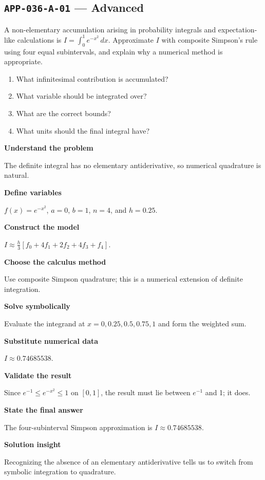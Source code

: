 \documentclass[11pt]{book}
\newcommand{\pid}[1]{\texttt{#1}}
\begin{document}
\subsection*{\pid{APP-036-A-01} — Advanced}
\begin{problembox}
A non-elementary accumulation arising in probability integrals and expectation-like calculations is $I=\int_0^1 e^{-x^2}\,dx$. Approximate $I$ with composite Simpson's rule using four equal subintervals, and explain why a numerical method is appropriate.
\end{problembox}
\begin{promptbox}\begin{enumerate}
\item What infinitesimal contribution is accumulated?
\item What variable should be integrated over?
\item What are the correct bounds?
\item What units should the final integral have?
\end{enumerate}\end{promptbox}
\begin{solutionbox}
\textbf{Understand the problem}\par The definite integral has no elementary antiderivative, so numerical quadrature is natural.\par\medskip
\textbf{Define variables}\par $f(x)=e^{-x^2}$, $a=0$, $b=1$, $n=4$, and $h=0.25$.\par\medskip
\textbf{Construct the model}\par $I\approx\frac{h}{3}[f_0+4f_1+2f_2+4f_3+f_4]$.\par\medskip
\textbf{Choose the calculus method}\par Use composite Simpson quadrature; this is a numerical extension of definite integration.\par\medskip
\textbf{Solve symbolically}\par Evaluate the integrand at $x=0,0.25,0.5,0.75,1$ and form the weighted sum.\par\medskip
\textbf{Substitute numerical data}\par $I\approx 0.74685538$.\par\medskip
\textbf{Validate the result}\par Since $e^{-1}\le e^{-x^2}\le1$ on $[0,1]$, the result must lie between $e^{-1}$ and 1; it does.\par\medskip
\textbf{State the final answer}\par The four-subinterval Simpson approximation is $I\approx 0.74685538$.\par\medskip
\textbf{Solution insight}\par Recognizing the absence of an elementary antiderivative tells us to switch from symbolic integration to quadrature.\par\medskip
\end{solutionbox}
\end{document}
